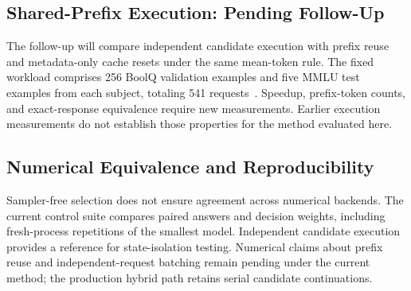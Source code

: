 \subsection{Shared-Prefix Execution: Pending Follow-Up}
\label{sec:prefix-results}
The follow-up will compare independent candidate execution with prefix reuse
and metadata-only cache resets under the same mean-token rule.
The fixed workload comprises 256 BoolQ validation examples and five MMLU
test examples from each subject, totaling 541 requests~\cite{boolq,mmlu}.
Speedup, prefix-token counts, and exact-response equivalence require new
measurements. Earlier execution measurements do not establish those properties
for the method evaluated here.

\subsection{Numerical Equivalence and Reproducibility}
\label{sec:repeatability}
Sampler-free selection does not ensure agreement across numerical backends.
The current control suite compares paired answers and decision weights, including
fresh-process repetitions of the smallest model. Independent candidate execution
provides a reference for state-isolation testing. Numerical claims about prefix
reuse and independent-request batching remain pending under the current method;
the production hybrid path retains serial candidate continuations.
